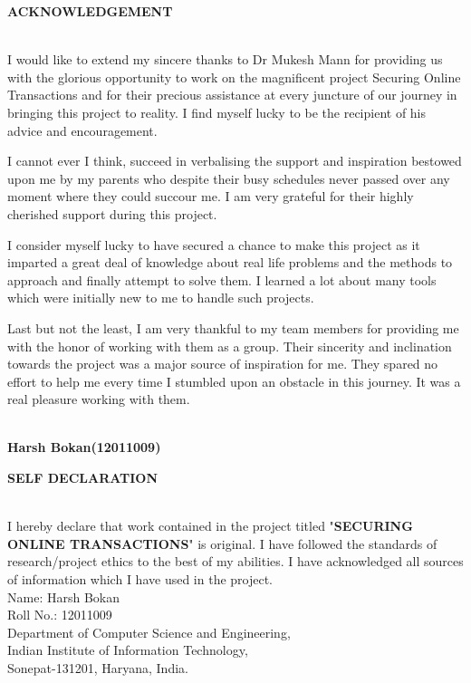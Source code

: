 \documentclass[12pt, oneside, a4paper]{article}
\begin{document}
\thispagestyle{empty}
\pagebreak
\begin{center}
    \begin{Large}\textbf{ACKNOWLEDGEMENT}\end{Large}
\end{center}\\
\vspace{1cm}
I would like to extend my sincere thanks to Dr Mukesh Mann for providing us with the glorious opportunity to work on the magnificent project Securing Online Transactions and for their precious assistance at every juncture of our journey in bringing this project to reality. I find myself lucky to be the recipient of his advice and encouragement. 

I cannot ever I think, succeed in verbalising the support and inspiration bestowed upon me by my parents who despite their busy schedules never passed over any moment where they could succour me. I am very grateful for their highly cherished support during this project.

I consider myself lucky to have secured a chance to make this project as it imparted a great deal of knowledge about real life problems and the methods to approach and finally attempt to solve them. I learned a lot about many tools which were initially new to me to handle such projects. 

Last but not the least, I am very thankful to my team members for providing me with the honor of working with them as a group. Their sincerity and inclination towards the project was a major source of inspiration for me. They spared no effort to help me every time I stumbled upon an obstacle in this journey. It was a real pleasure working with them.

\vspace{2cm}\\
\textbf{Harsh Bokan(12011009)}
\setcounter{page}{2}
\pagebreak

\begin{center}
    \begin{Large}\textbf{SELF DECLARATION}\end{Large}
\end{center}\\
\vspace{1cm}
I hereby declare that work contained in the project titled "\textbf{SECURING ONLINE TRANSACTIONS}" is original. I have followed the standards of research/project ethics to the best of my abilities. I have acknowledged all sources of information which I have used in the project.
\vspace{4cm}\\
Name: Harsh Bokan\\
Roll No.: 12011009\\
Department of Computer Science and Engineering,\\
Indian Institute of Information Technology,\\
Sonepat-131201, Haryana, India.
\pagebreak
\end{document}
